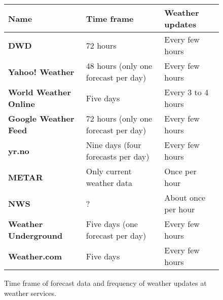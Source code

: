 \begin{figure}
\begin{longtable}{|p{}|p{}|p{}|}
  \hline
  \textbf{Name} & \textbf{Time frame} & \textbf{Weather updates} \\
  \hline\hline
  \textbf{DWD} & 72 hours & Every few hours \\
  \hline
  \textbf{Yahoo! Weather} & 48 hours (only one forecast per day) & Every few hours \\
  \hline
  \textbf{World Weather Online} & Five days & Every \num{3} to \num{4} hours \\
  \hline
  \textbf{Google Weather Feed} & 72 hours (only one forecast per day) & Every few hours \\
  \hline
  \textbf{yr.no} & Nine days (four forecasts per day) & Every few hours \\
  \hline
  \textbf{METAR} & Only current weather data & Once per hour \\
  \hline
  \textbf{NWS} & ? & About once per hour \\ %
  \hline
  \textbf{Weather Underground} & Five days (one forecast per day) & Every few hours \\
  \hline
  \textbf{Weather.com} & Five days & Every few hours \\
  \hline
\end{longtable}
\vspace{.5em}
\caption{Time frame of forecast data and frequency of weather updates at weather services.}
\label{table:weather_data7}
\end{figure}


